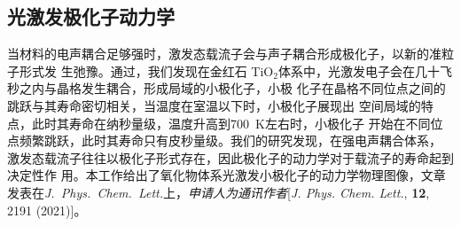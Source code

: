 
\subsection{光激发极化子动力学}

当材料的电声耦合足够强时，激发态载流子会与声子耦合形成极化子，以新的准粒子形式发
生弛豫。通过\hnamd{}，我们发现在金红石
TiO$_2$体系中，光激发电子会在几十飞秒之内与晶格发生耦合，形成局域的小极化子，小极
化子在晶格不同位点之间的跳跃与其寿命密切相关，当温度在室温以下时，小极化子展现出
空间局域的特点，此时其寿命在纳秒量级，温度升高到\SI{700}{\kelvin}左右时，小极化子
开始在不同位点频繁跳跃，此时其寿命只有皮秒量级。我们的研究发现，在强电声耦合体系，
激发态载流子往往以极化子形式存在，因此极化子的动力学对于载流子的寿命起到决定性作
用。本工作给出了氧化物体系光激发小极化子的动力学物理图像，文章发表在\textit{J.\
  Phys.\ Chem.\ Lett.}上，\emph{申请人为通讯作者}[\textit{J. Phys. Chem. Lett.},
\textbf{12}, 2191 (2021)]。

